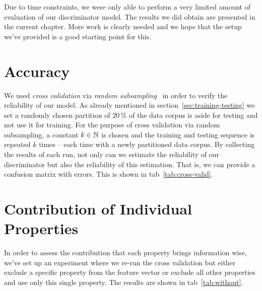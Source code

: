 \documentclass{graphstudy}
\begin{document}
Due to time constraints, we were only able to perform a very limited amount of evaluation of our discriminator model.
The results we did obtain are presented in the current chapter.  More work is clearly needed and we hope that the setup
we've provided is a good starting point for this.

\section{Accuracy}
\label{sec:eval-accuracy}

We used \emph{cross validation} via \emph{random subsampling}~\cite{Kohavi1995} in order to verify the reliability of
our model.  As already mentioned in \acl{section}~\ref{sec:training-testing} we set a randomly chosen partition of
\(20\,\%\) of the data corpus is aside for testing and not use it for training.  For the purpose of cross validation via
random subsampling, a constant \(k\in\mathbb{N}\) is chosen and the training and testing sequence is repeated \(k\) times --
each time with a newly partitioned data corpus.  By collecting the results of each run, not only can we estimate the
reliability of our discriminator but also the reliability of this estimation.  That is, we can provide a confusion
matrix with errors.  This is shown in \acl{tab}~\ref{tab:cross-valid}.

\begin{Table}
  \begin{center}
  \end{center}
  \caption[Cross Validation Confusion Matrix]{%
    Confusion matrix with errors obtained through cross validation via random subsampling and some additional
    information.
  }
  \label{tab:cross-valid}
\end{Table}

\section{Contribution of Individual Properties}

In order to assess the contribution that each property brings information wise, we've set up an experiment where we
re-run the cross validation but either exclude a specific property from the feature vector or exclude all other
properties and use only this single property.  The results are shown in \acl{tab}~\ref{tab:without}.
\end{document}
